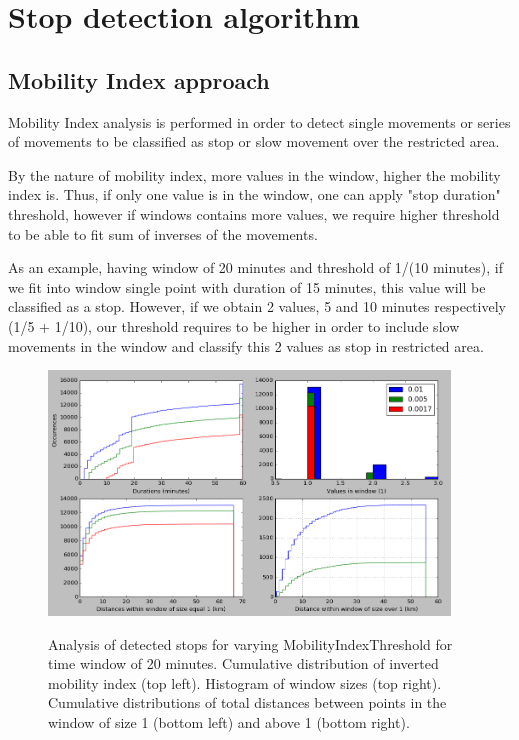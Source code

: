 \section{Stop detection algorithm}
\label{cha:eval_stopdetc}

\subsection{Mobility Index approach}

Mobility Index analysis is performed in order to detect single movements or series of movements to be classified as stop or slow movement over the restricted area. 

By the nature of mobility index, more values in the window, higher the mobility index is. Thus, if only one value is in the window, one can apply "stop duration" threshold, however if windows contains more values, we require higher threshold to be able to fit sum of inverses of the movements. 

As an example, having window of 20 minutes and threshold of 1/(10 minutes), if we fit into window single point with duration of 15 minutes, this value will be classified as a stop. However, if we obtain 2 values, 5 and 10 minutes respectively (1/5 + 1/10), our threshold requires to be higher in order to include slow movements in the window and classify this 2 values as stop in restricted area.

\begin{figure}[!ht]
	\centering
	\includegraphics[width=0.95\textwidth]{images/mob_index_analy1.png}\\
	\caption{ Analysis of detected stops for varying MobilityIndexThreshold for time window of 20 minutes. Cumulative distribution of inverted mobility index (top left). Histogram of window sizes (top right). Cumulative distributions of total distances between points in the window of size 1 (bottom left) and above 1 (bottom right). }
	\label{fig:mob_index_analy1}
\end{figure}
\FloatBarrier

